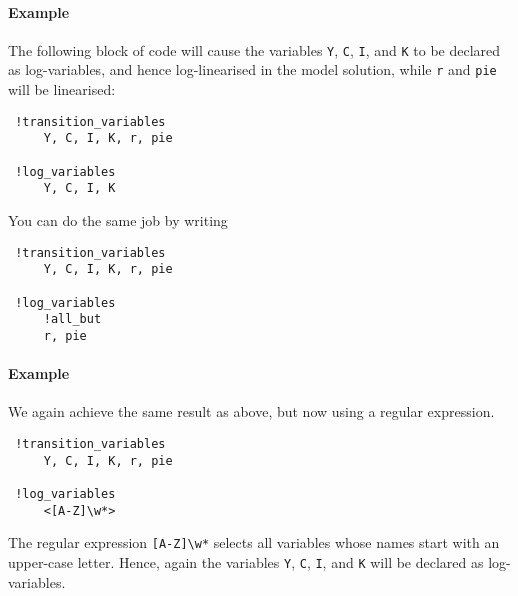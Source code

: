  \paragraph{Example}
 
 The following block of code will cause the variables \texttt{Y},
 \texttt{C}, \texttt{I}, and \texttt{K} to be declared as log-variables,
 and hence log-linearised in the model solution, while \texttt{r} and
 \texttt{pie} will be linearised:
 
 \begin{verbatim}
 !transition_variables
     Y, C, I, K, r, pie
 
 !log_variables
     Y, C, I, K
 \end{verbatim}
 
 You can do the same job by writing
 
 \begin{verbatim}
 !transition_variables
     Y, C, I, K, r, pie
 
 !log_variables
     !all_but
     r, pie
 \end{verbatim}
 
 \paragraph{Example}
 
 We again achieve the same result as above, but now using a regular
 expression.
 
 \begin{verbatim}
 !transition_variables
     Y, C, I, K, r, pie
 
 !log_variables
     <[A-Z]\w*>
 \end{verbatim}
 
 The regular expression \texttt{{[}A-Z{]}\textbackslash{}w*} selects all
 variables whose names start with an upper-case letter. Hence, again the
 variables \texttt{Y}, \texttt{C}, \texttt{I}, and \texttt{K} will be
 declared as log-variables.


